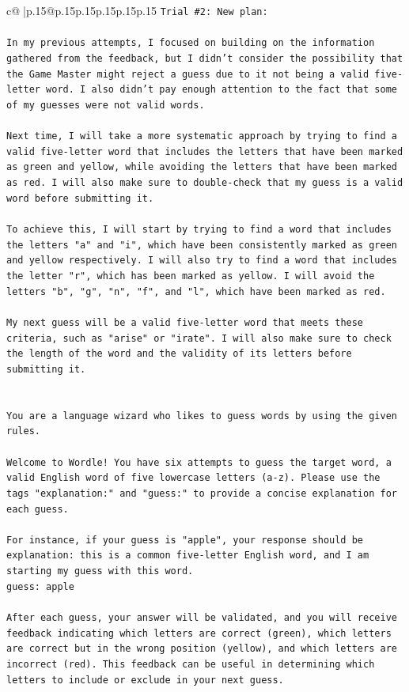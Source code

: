\documentclass{article}
\begin{document}
{\begin{supertabular}{c@{$\;$}|p{.15\linewidth}@{}p{.15\linewidth}p{.15\linewidth}p{.15\linewidth}p{.15\linewidth}p{.15\linewidth}}
{{{\texttt{Trial \#2: New plan: } \\
\\ 
\texttt{In my previous attempts, I focused on building on the information gathered from the feedback, but I didn't consider the possibility that the Game Master might reject a guess due to it not being a valid five{-}letter word. I also didn't pay enough attention to the fact that some of my guesses were not valid words.} \\
\\ 
\texttt{Next time, I will take a more systematic approach by trying to find a valid five{-}letter word that includes the letters that have been marked as green and yellow, while avoiding the letters that have been marked as red. I will also make sure to double{-}check that my guess is a valid word before submitting it.} \\
\\ 
\texttt{To achieve this, I will start by trying to find a word that includes the letters "a" and "i", which have been consistently marked as green and yellow respectively. I will also try to find a word that includes the letter "r", which has been marked as yellow. I will avoid the letters "b", "g", "n", "f", and "l", which have been marked as red.} \\
\\ 
\texttt{My next guess will be a valid five{-}letter word that meets these criteria, such as "arise" or "irate". I will also make sure to check the length of the word and the validity of its letters before submitting it.} \\
\\ 
\\ 
\texttt{You are a language wizard who likes to guess words by using the given rules.} \\
\\ 
\texttt{Welcome to Wordle! You have six attempts to guess the target word, a valid English word of five lowercase letters (a{-}z). Please use the tags "explanation:" and "guess:" to provide a concise explanation for each guess.} \\
\\ 
\texttt{For instance, if your guess is "apple", your response should be} \\
\texttt{explanation: this is a common five{-}letter English word, and I am starting my guess with this word.} \\
\texttt{guess: apple} \\
\\ 
\texttt{After each guess, your answer will be validated, and you will receive feedback indicating which letters are correct (green), which letters are correct but in the wrong position (yellow), and which letters are incorrect (red). This feedback can be useful in determining which letters to include or exclude in your next guess.} \\
}}}
\end{supertabular}}
\end{document}
